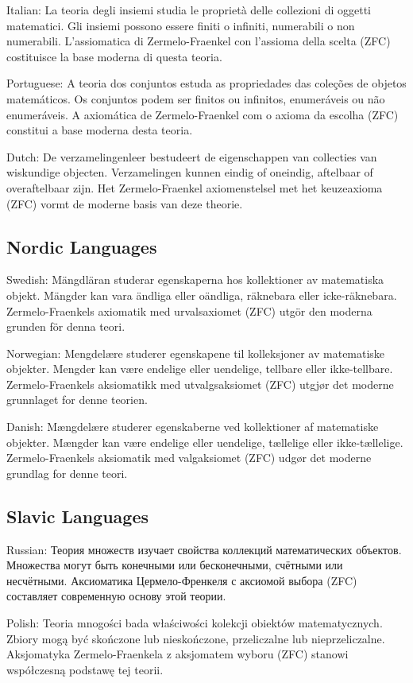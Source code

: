 \documentclass[12pt]{article}
\begin{document}
Italian: La teoria degli insiemi studia le proprietà delle collezioni di oggetti matematici. Gli insiemi possono essere finiti o infiniti, numerabili o non numerabili. L'assiomatica di Zermelo-Fraenkel con l'assioma della scelta (ZFC) costituisce la base moderna di questa teoria.

Portuguese: A teoria dos conjuntos estuda as propriedades das coleções de objetos matemáticos. Os conjuntos podem ser finitos ou infinitos, enumeráveis ou não enumeráveis. A axiomática de Zermelo-Fraenkel com o axioma da escolha (ZFC) constitui a base moderna desta teoria.

Dutch: De verzamelingenleer bestudeert de eigenschappen van collecties van wiskundige objecten. Verzamelingen kunnen eindig of oneindig, aftelbaar of overaftelbaar zijn. Het Zermelo-Fraenkel axiomenstelsel met het keuzeaxioma (ZFC) vormt de moderne basis van deze theorie.

\subsection{Nordic Languages}

Swedish: Mängdläran studerar egenskaperna hos kollektioner av matematiska objekt. Mängder kan vara ändliga eller oändliga, räknebara eller icke-räknebara. Zermelo-Fraenkels axiomatik med urvalsaxiomet (ZFC) utgör den moderna grunden för denna teori.

Norwegian: Mengdelære studerer egenskapene til kolleksjoner av matematiske objekter. Mengder kan være endelige eller uendelige, tellbare eller ikke-tellbare. Zermelo-Fraenkels aksiomatikk med utvalgsaksiomet (ZFC) utgjør det moderne grunnlaget for denne teorien.

Danish: Mængdelære studerer egenskaberne ved kollektioner af matematiske objekter. Mængder kan være endelige eller uendelige, tællelige eller ikke-tællelige. Zermelo-Fraenkels aksiomatik med valgaksiomet (ZFC) udgør det moderne grundlag for denne teori.

\subsection{Slavic Languages}

Russian: Теория множеств изучает свойства коллекций математических объектов. Множества могут быть конечными или бесконечными, счётными или несчётными. Аксиоматика Цермело-Френкеля с аксиомой выбора (ZFC) составляет современную основу этой теории.

Polish: Teoria mnogości bada właściwości kolekcji obiektów matematycznych. Zbiory mogą być skończone lub nieskończone, przeliczalne lub nieprzeliczalne. Aksjomatyka Zermelo-Fraenkela z aksjomatem wyboru (ZFC) stanowi współczesną podstawę tej teorii.
\end{document}
